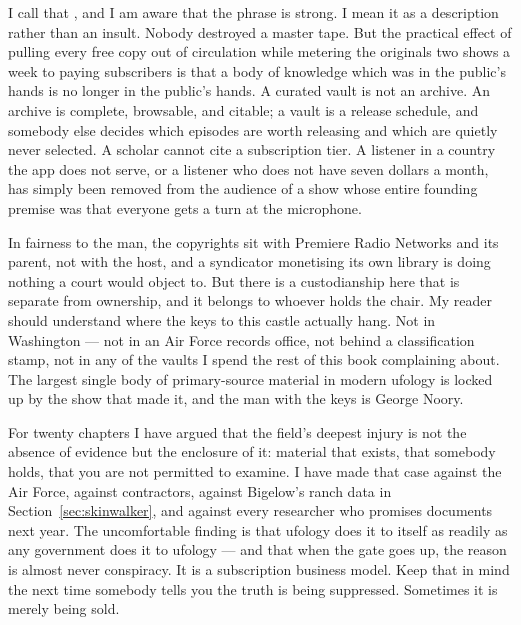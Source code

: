 I call that , and I am aware that the phrase is strong. I mean it as a
description rather than an insult. Nobody destroyed a master tape. But the practical effect of pulling
every free copy out of circulation while metering the originals two shows a week to paying subscribers
is that a body of knowledge which was in the public's hands is no longer in the public's hands. A
curated vault is not an archive. An archive is complete, browsable, and citable; a vault is a
release schedule, and somebody else decides which episodes are worth releasing and which are quietly
never selected. A scholar cannot cite a subscription tier. A listener in a country the app does not
serve, or a listener who does not have seven dollars a month, has simply been removed from the
audience of a show whose entire founding premise was that everyone gets a turn at the microphone.

In fairness to the man, the copyrights sit with Premiere Radio Networks and its parent, not with the
host, and a syndicator monetising its own library is doing nothing a court would object to. But there
is a custodianship here that is separate from ownership, and it belongs to whoever holds the chair. My
reader should understand where the keys to this castle actually hang. Not in Washington --- not in an
Air Force records office, not behind a classification stamp, not in any of the vaults I spend the rest
of this book complaining about. The largest single body of primary-source material in modern ufology is
locked up by the show that made it, and the man with the keys is George Noory.

\begin{funfact}
 For twenty chapters I have argued that the field's
deepest injury is not the absence of evidence but the enclosure of it: material that exists, that
somebody holds, that you are not permitted to examine. I have made that case against the Air Force,
against contractors, against Bigelow's ranch data in Section~\ref{sec:skinwalker}, and against every
researcher who promises documents next year. The uncomfortable finding is that ufology does it to
itself as readily as any government does it to ufology --- and that when the gate goes up, the
reason is almost never conspiracy. It is a subscription business model. Keep that in mind the next
time somebody tells you the truth is being suppressed. Sometimes it is merely being sold.
\end{funfact}


